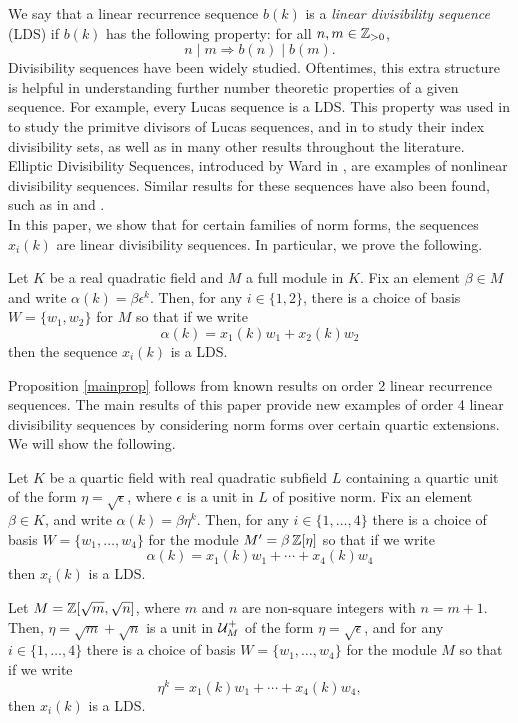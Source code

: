 \documentclass[11pt]{amsart}
\begin{document}
We say that a linear recurrence sequence $b(k)$ is a \textit{linear divisibility sequence} (LDS) if $b(k)$ has the following property: for all $n, m \in \mathbb{Z}_{> 0}$,
\[ n \mid m \Rightarrow b(n) \mid b(m).\]
Divisibility sequences have been widely studied. Oftentimes, this extra structure is helpful in understanding further number theoretic properties of a given sequence. For example, every Lucas sequence is a LDS. This property was used in \cite{BHV} to study the primitve divisors of Lucas sequences, and in \cite{smyth} to study their index divisibility sets, as well as in many other results throughout the literature. Elliptic Divisibility Sequences, introduced by Ward in \cite{ward}, are examples of nonlinear divisibility sequences. Similar results for these sequences have also been found, such as in \cite{stangesilverman} and \cite{EDSprimdivs}.\\


In this paper, we show that for certain families of norm forms, the sequences $x_i(k)$ are linear divisibility sequences. In particular, we prove the following.

\begin{prop} \label{mainprop} Let $K$ be a real quadratic field and $M$ a full module in $K$. Fix an element $\beta \in M$ and write $\alpha(k)=\beta \epsilon^k$. Then, for any $i \in \{1, 2\}$, there is a choice of basis $W=\{w_1, w_2\}$ for $M$ so that if we write
\[\alpha(k)=x_1(k)w_1+x_2(k)w_2\]
then the sequence $x_i(k)$ is a LDS. 
\end{prop}

Proposition \ref{mainprop} follows from known results on order 2 linear recurrence sequences. The main results of this paper provide new examples of order 4 linear divisibility sequences by considering norm forms over certain quartic extensions. We will show the following.

\begin{thm} \label{thm1} Let $K$ be a quartic field with real quadratic subfield $L$ containing a quartic unit of the form $\eta=\sqrt{\epsilon}$, where $\epsilon$ is a unit in $L$ of positive norm. Fix an element $\beta \in K$, and write $\alpha(k)=\beta \eta^k$. Then, for any $i \in \{1, \dots, 4\}$ there is a choice of basis  $W=\{w_1, \dots, w_4\}$ for the module $M'=\beta \,\mathbb{Z}[\eta]$ so that if we write
\[\alpha(k)=x_1(k)w_1+\cdots+x_4(k)w_4\]
then $x_i(k)$ is a LDS.
\end{thm}

\begin{thm}\label{thm2}   Let $M=\mathbb{Z}[\sqrt{m}, \sqrt{n}]$, where $m$ and $n$ are non-square integers with $n=m+1$. Then, $\eta=\sqrt{m}+\sqrt{n}$ is a unit in $\mathcal{U}_M^+$ of the form $\eta=\sqrt{\epsilon}$, and for any $i \in \{1, \dots, 4\}$ there is a choice of basis $W=\{w_1, \dots, w_4\}$ for the module $M$ so that if we write
\[\eta^k=x_1(k)w_1+\cdots+x_4(k)w_4,\]
then $x_i(k)$ is a LDS. 
\end{thm}
\end{document}
